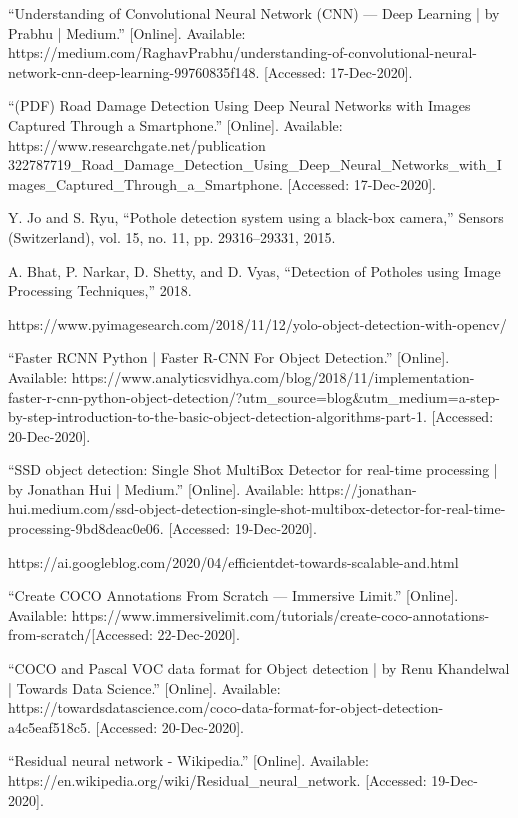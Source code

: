 \documentclass[12pt]{report}
\begin{document}
\begin{thebibliography}{1}
“Understanding of Convolutional Neural Network (CNN) — Deep Learning | by Prabhu | Medium.” [Online]. Available: https://medium.com/RaghavPrabhu/understanding-of-convolutional-neural-network-cnn-deep-learning-99760835f148. [Accessed: 17-Dec-2020].

“(PDF) Road Damage Detection Using Deep Neural Networks with Images Captured Through a Smartphone.” [Online]. Available: https://www.researchgate.net/publication  322787719\_Road\_Damage\_Detection\_Using\_Deep\_Neural\_Networks\_with\_Images\_Captured\_Through\_a\_Smartphone. [Accessed: 17-Dec-2020].

Y. Jo and S. Ryu, “Pothole detection system using a black-box camera,” Sensors (Switzerland), vol. 15, no. 11, pp. 29316–29331, 2015.

A. Bhat, P. Narkar, D. Shetty, and D. Vyas, “Detection of Potholes using Image Processing Techniques,” 2018.

https://www.pyimagesearch.com/2018/11/12/yolo-object-detection-with-opencv/

“Faster RCNN Python | Faster R-CNN For Object Detection.” [Online]. Available: https://www.analyticsvidhya.com/blog/2018/11/implementation-faster-r-cnn-python-object-detection/?utm\_source=blog\&utm\_medium=a-step-by-step-introduction-to-the-basic-object-detection-algorithms-part-1. [Accessed: 20-Dec-2020].

“SSD object detection: Single Shot MultiBox Detector for real-time processing | by Jonathan Hui | Medium.” [Online]. Available: https://jonathan-hui.medium.com/ssd-object-detection-single-shot-multibox-detector-for-real-time-processing-9bd8deac0e06. [Accessed: 19-Dec-2020].

https://ai.googleblog.com/2020/04/efficientdet-towards-scalable-and.html

“Create COCO Annotations From Scratch — Immersive Limit.” [Online]. Available: https://www.immersivelimit.com/tutorials/create-coco-annotations-from-scratch/[Accessed: 22-Dec-2020].

“COCO and Pascal VOC data format for Object detection | by Renu Khandelwal | Towards Data Science.” [Online]. Available: https://towardsdatascience.com/coco-data-format-for-object-detection-a4c5eaf518c5. [Accessed: 20-Dec-2020].

“Residual neural network - Wikipedia.” [Online]. Available: https://en.wikipedia.org/wiki/Residual\_neural\_network. [Accessed: 19-Dec-2020].


\end{thebibliography}
\end{document}
